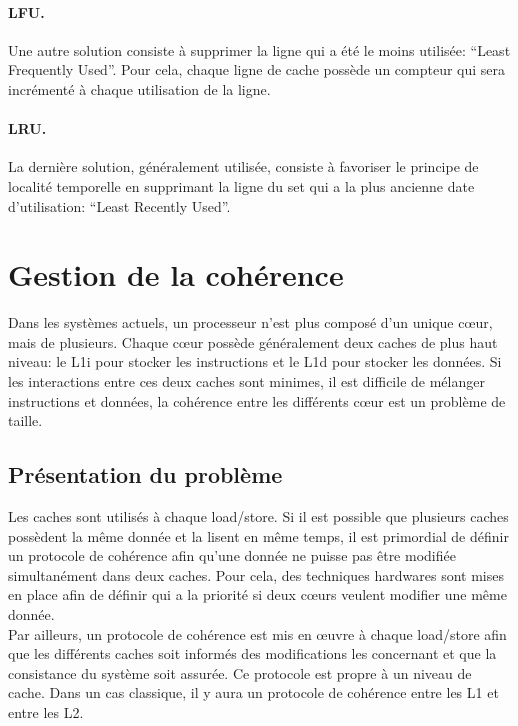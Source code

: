 \documentclass[a4paper]{article}
\begin{document}
\paragraph{LFU.} Une autre solution consiste à supprimer la ligne qui a été le moins utilisée: ``Least Frequently Used''. Pour cela, chaque ligne de cache possède un compteur qui sera incrémenté à chaque utilisation de la ligne. 

\paragraph{LRU.} La dernière solution, généralement utilisée, consiste à favoriser le principe de localité temporelle en supprimant la ligne du set qui a la plus ancienne date d'utilisation: ``Least Recently Used''.

\newpage
\section{Gestion de la cohérence}
\indent Dans les systèmes actuels, un processeur n'est plus composé d'un unique c{\oe}ur, mais de plusieurs. Chaque c{\oe}ur possède généralement deux caches de plus haut niveau: le L1i pour stocker les instructions et le L1d pour stocker les données. Si les interactions entre ces deux caches sont minimes, il est difficile de mélanger instructions et données, la cohérence entre les différents c{\oe}ur est un problème de taille.

\subsection{Présentation du problème}
\indent Les caches sont utilisés à chaque load/store. Si il est possible que plusieurs caches possèdent la même donnée et la lisent en même temps, il est primordial de définir un protocole de cohérence afin qu'une donnée ne puisse pas être modifiée simultanément dans deux caches. Pour cela, des techniques hardwares sont mises en place afin de définir qui a la priorité si deux c{\oe}urs veulent modifier une même donnée. \\

\indent Par ailleurs, un protocole de cohérence est mis en {\oe}uvre à chaque load/store afin que les différents caches soit informés des modifications les concernant et que la consistance du système soit assurée. Ce protocole est propre à un niveau de cache. Dans un cas classique, il y aura un protocole de cohérence entre les L1 et entre les L2.
\end{document}
